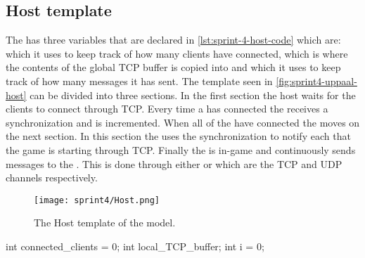 \subsection{Host template}
The  has three variables that are declared in \autoref{lst:sprint-4-host-code} which are:
 which it uses to keep track of how many clients have connected,  which is where the contents of the global TCP buffer is copied into and  which it uses to keep track of how many messages it has sent. 
The template seen in \autoref{fig:sprint4-uppaal-host} can be divided into three sections.
In the first section the host waits for the clients to connect through TCP.
Every time a  has connected the  receives a  synchronization and  is incremented.
When all of the  have connected the  moves on the next section.
In this section the  uses the  synchronization to notify each  that the game is starting through TCP.
Finally the  is in-game and continuously sends messages to the .
This is done through either  or  which are the TCP and UDP channels respectively.
\begin{figure}[h]
    \centering
    \texttt{[image: sprint4/Host.png]}
    \caption{The Host template of the \uppaal model.}
    \label{fig:sprint4-uppaal-host}
\end{figure}
\begin{uppaalcode}[caption={local Host declarations}, label={lst:sprint-4-host-code},captionpos=b]

int connected_clients = 0;
int local_TCP_buffer;
int i = 0;
\end{uppaalcode}


